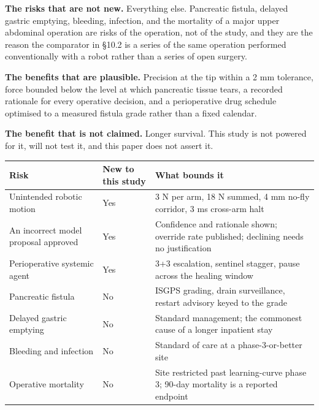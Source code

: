 \textbf{The risks that are not new.} Everything else. Pancreatic fistula,
delayed gastric emptying, bleeding, infection, and the mortality of a major
upper abdominal operation are risks of the operation, not of the study, and they
are the reason the comparator in \S 10.2 is a series of the same operation
performed conventionally with a robot rather than a series of open surgery.

\textbf{The benefits that are plausible.} Precision at the tip within a 2 mm
tolerance, force bounded below the level at which pancreatic tissue tears, a
recorded rationale for every operative decision, and a perioperative drug
schedule optimised to a measured fistula grade rather than a fixed calendar.

\textbf{The benefit that is not claimed.} Longer survival. This study is not
powered for it, will not test it, and this paper does not assert it.

\vspace{0.30em}

\noindent\begin{tabularx}{\textwidth}{L{4.4cm} L{2.6cm} Y}
\toprule
\textbf{Risk} & \textbf{New to this study} & \textbf{What bounds it} \\
\midrule
Unintended robotic motion & Yes & 3 N per arm, 18 N summed, 4 mm no-fly corridor, 3 ms cross-arm halt \\
An incorrect model proposal approved & Yes & Confidence and rationale shown; override rate published; declining needs no justification \\
Perioperative systemic agent & Yes & 3+3 escalation, sentinel stagger, pause across the healing window \\
Pancreatic fistula & No & ISGPS grading, drain surveillance, restart advisory keyed to the grade \\
Delayed gastric emptying & No & Standard management; the commonest cause of a longer inpatient stay \\
Bleeding and infection & No & Standard of care at a phase-3-or-better site \\
Operative mortality & No & Site restricted past learning-curve phase 3; 90-day mortality is a reported endpoint \\
\bottomrule
\end{tabularx}

\vspace{0.30em}
